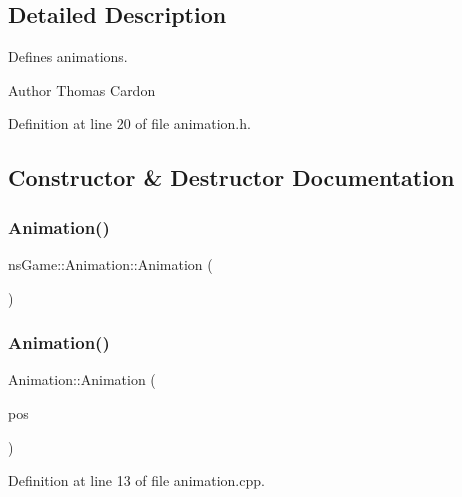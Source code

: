\subsection{Detailed Description}
Defines animations. 

\begin{DoxyAuthor}{Author}
Thomas Cardon 
\end{DoxyAuthor}


Definition at line 20 of file animation.\+h.



\subsection{Constructor \& Destructor Documentation}
\mbox{\label{classns_game_1_1_animation_aebaabfa10569678e6a7d30fa9c8d031d}} 
\subsubsection{\texorpdfstring{Animation()}{Animation()}\hspace{0.1cm}{\footnotesize\ttfamily [1/4]}}
{\footnotesize\ttfamily ns\+Game\+::\+Animation\+::\+Animation (\begin{DoxyParamCaption}{ }\end{DoxyParamCaption})}

\mbox{\label{classns_game_1_1_animation_a0554455321614f3f94bbcbd5b784cfd5}} 
\subsubsection{\texorpdfstring{Animation()}{Animation()}\hspace{0.1cm}{\footnotesize\ttfamily [2/4]}}
{\footnotesize\ttfamily Animation\+::\+Animation (\begin{DoxyParamCaption}\item[{ns\+Graphics\+::\+Vec2D}]{pos }\end{DoxyParamCaption})}



Definition at line 13 of file animation.\+cpp.

